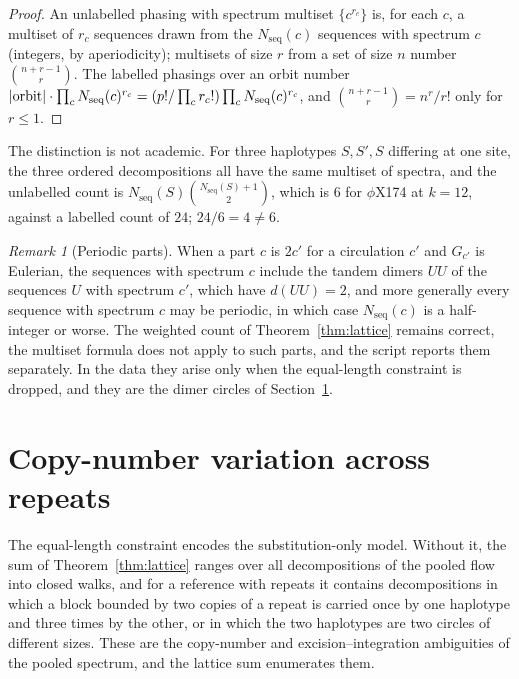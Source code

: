 \documentclass[11pt]{article}
\theoremstyle{plain}
\theoremstyle{definition}
\theoremstyle{remark}
\newtheorem{remark}[theorem]{Remark}
\newcommand{\Nseq}{N_{\mathrm{seq}}}
\begin{document}
\begin{proof}
An unlabelled phasing with spectrum multiset $\{c^{r_c}\}$ is, for each $c$, a multiset of
$r_c$ sequences drawn from the $\Nseq(c)$ sequences with spectrum $c$ (integers, by
aperiodicity); multisets of size $r$ from a set of size $n$ number $\binom{n+r-1}{r}$. The
labelled phasings over an orbit number $|{\rm orbit}|\cdot\prod_c\Nseq(c)^{r_c}=
(p!/\prod_c r_c!)\prod_c\Nseq(c)^{r_c}$, and $\binom{n+r-1}{r}=n^r/r!$ only for $r\le1$.
\end{proof}

The distinction is not academic. For three haplotypes $S,S',S$ differing at one site, the
three ordered decompositions all have the same multiset of spectra, and the unlabelled count is
$\Nseq(S)\binom{\Nseq(S)+1}{2}$, which is $6$ for $\phi$X174 at $k=12$, against a labelled
count of $24$; $24/6=4\ne6$.

\begin{remark}[Periodic parts]\label{rem:periodic}
When a part $c$ is $2c'$ for a circulation $c'$ and $G_{c'}$ is Eulerian, the sequences with
spectrum $c$ include the tandem dimers $UU$ of the sequences $U$ with spectrum $c'$, which
have $d(UU)=2$, and more generally every sequence with spectrum $c$ may be periodic, in which
case $\Nseq(c)$ is a half-integer or worse. The weighted count of Theorem~\ref{thm:lattice}
remains correct, the multiset formula does not apply to such parts, and the script reports
them separately. In the data they arise only when the equal-length constraint is dropped, and
they are the dimer circles of Section~\ref{sec:cnv}.
\end{remark}

\section{Copy-number variation across repeats}\label{sec:cnv}

The equal-length constraint encodes the substitution-only model. Without it, the sum of
Theorem~\ref{thm:lattice} ranges over all decompositions of the pooled flow into closed walks,
and for a reference with repeats it contains decompositions in which a block bounded by two
copies of a repeat is carried once by one haplotype and three times by the other, or in which
the two haplotypes are two circles of different sizes. These are the copy-number and
excision--integration ambiguities of the pooled spectrum, and the lattice sum enumerates them.
\end{document}
